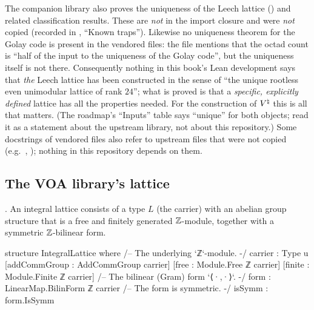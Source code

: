 \begin{warning}[title={Trap: what was \emph{not} vendored}]\label{ch02:warn:uniqueness}
The companion library also proves the uniqueness of the Leech lattice () and
related classification results.  These are \emph{not} in the import closure and were \emph{not}
copied (recorded in , ``Known traps'').  Likewise no uniqueness
theorem for the Golay code is present in the vendored files: the file
 mentions that the octad count is ``half of the input to the
uniqueness of the Golay code'', but the uniqueness itself is not there.  Consequently nothing in
this book's Lean development says that \emph{the} Leech lattice has been constructed in the sense
of ``the unique rootless even unimodular lattice of rank $24$''; what is proved is that a
\emph{specific, explicitly defined} lattice  has all the properties needed.
For the construction of ${V^{\natural}}$ this is all that matters.  (The roadmap's ``Inputs'' table says
``unique'' for both objects; read it as a statement about the upstream library, not about this
repository.)  Some docstrings of vendored files also refer to upstream files that were not copied
(e.g.\ , );
nothing in this repository depends on them.
\end{warning}

\subsection{The VOA library's lattice}\label{ch02:sec:voalattice}

\begin{definition}\label{ch02:def:voalattice}
.  An integral lattice consists of a type $L$ (the
carrier) with an abelian group structure that is a free and finitely generated ${\mathbb{Z}}$-module,
together with a symmetric ${\mathbb{Z}}$-bilinear form.
\end{definition}
\begin{leancode}
structure IntegralLattice where
  /-- The underlying `ℤ`-module. -/
  carrier : Type u
  [addCommGroup : AddCommGroup carrier]
  [free : Module.Free ℤ carrier]
  [finite : Module.Finite ℤ carrier]
  /-- The bilinear (Gram) form `⟨·,·⟩`. -/
  form : LinearMap.BilinForm ℤ carrier
  /-- The form is symmetric. -/
  isSymm : form.IsSymm
\end{leancode}


